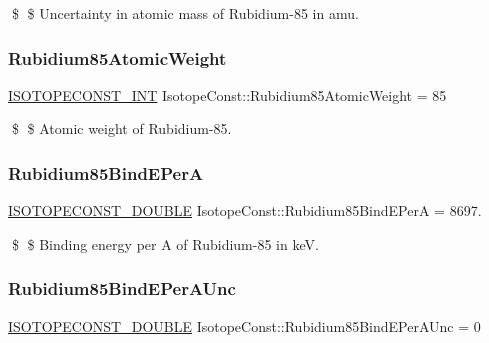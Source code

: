 \$ \$ Uncertainty in atomic mass of Rubidium-\/85 in amu. \mbox{\label{group___isotope_const-_rubidium-_rb85_gafc86c4a3cf4a48e297f7618b63195b36}} 
\subsubsection{\texorpdfstring{Rubidium85\+Atomic\+Weight}{Rubidium85AtomicWeight}}
{\footnotesize\ttfamily \mbox{\hyperlink{group___isotope_const-_macros_ga5f18360b3e99483a35c32d789e62621c}{I\+S\+O\+T\+O\+P\+E\+C\+O\+N\+S\+T\+\_\+\+I\+NT}} Isotope\+Const\+::\+Rubidium85\+Atomic\+Weight = 85}

\$ \$ Atomic weight of Rubidium-\/85. \mbox{\label{group___isotope_const-_rubidium-_rb85_ga2b3409cc71e007de3b74033e707a54ed}} 
\subsubsection{\texorpdfstring{Rubidium85\+Bind\+E\+PerA}{Rubidium85BindEPerA}}
{\footnotesize\ttfamily \mbox{\hyperlink{group___isotope_const-_macros_ga8f45a7272ce02c0b4c65c44636ed719a}{I\+S\+O\+T\+O\+P\+E\+C\+O\+N\+S\+T\+\_\+\+D\+O\+U\+B\+LE}} Isotope\+Const\+::\+Rubidium85\+Bind\+E\+PerA = 8697.}

\$ \$ Binding energy per A of Rubidium-\/85 in keV. \mbox{\label{group___isotope_const-_rubidium-_rb85_ga7f20a053372453bd9c0b718d6850e881}} 
\subsubsection{\texorpdfstring{Rubidium85\+Bind\+E\+Per\+A\+Unc}{Rubidium85BindEPerAUnc}}
{\footnotesize\ttfamily \mbox{\hyperlink{group___isotope_const-_macros_ga8f45a7272ce02c0b4c65c44636ed719a}{I\+S\+O\+T\+O\+P\+E\+C\+O\+N\+S\+T\+\_\+\+D\+O\+U\+B\+LE}} Isotope\+Const\+::\+Rubidium85\+Bind\+E\+Per\+A\+Unc = 0}

